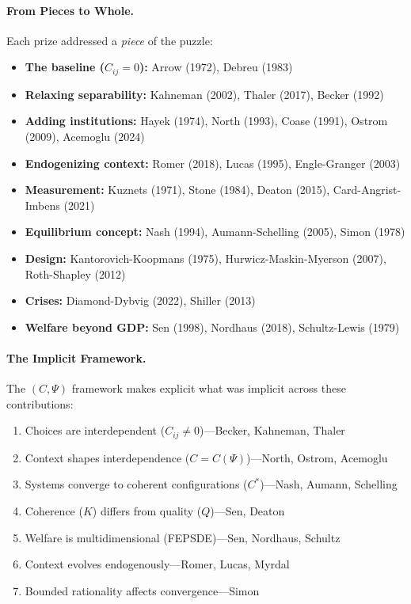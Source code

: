 \paragraph{From Pieces to Whole.}
Each prize addressed a \emph{piece} of the puzzle:
\begin{itemize}
  \item \textbf{The baseline ($C_{ij} = 0$):} Arrow (1972), Debreu (1983)
  \item \textbf{Relaxing separability:} Kahneman (2002), Thaler (2017), Becker (1992)
  \item \textbf{Adding institutions:} Hayek (1974), North (1993), Coase (1991), Ostrom (2009), Acemoglu (2024)
  \item \textbf{Endogenizing context:} Romer (2018), Lucas (1995), Engle-Granger (2003)
  \item \textbf{Measurement:} Kuznets (1971), Stone (1984), Deaton (2015), Card-Angrist-Imbens (2021)
  \item \textbf{Equilibrium concept:} Nash (1994), Aumann-Schelling (2005), Simon (1978)
  \item \textbf{Design:} Kantorovich-Koopmans (1975), Hurwicz-Maskin-Myerson (2007), Roth-Shapley (2012)
  \item \textbf{Crises:} Diamond-Dybvig (2022), Shiller (2013)
  \item \textbf{Welfare beyond GDP:} Sen (1998), Nordhaus (2018), Schultz-Lewis (1979)
\end{itemize}

\paragraph{The Implicit Framework.}
The $(C, \Psi)$ framework makes explicit what was implicit across these contributions:
\begin{enumerate}
  \item Choices are interdependent ($C_{ij} \neq 0$)---Becker, Kahneman, Thaler
  \item Context shapes interdependence ($C = C(\Psi)$)---North, Ostrom, Acemoglu
  \item Systems converge to coherent configurations ($C^*$)---Nash, Aumann, Schelling
  \item Coherence ($K$) differs from quality ($Q$)---Sen, Deaton
  \item Welfare is multidimensional (FEPSDE)---Sen, Nordhaus, Schultz
  \item Context evolves endogenously---Romer, Lucas, Myrdal
  \item Bounded rationality affects convergence---Simon
\end{enumerate}

